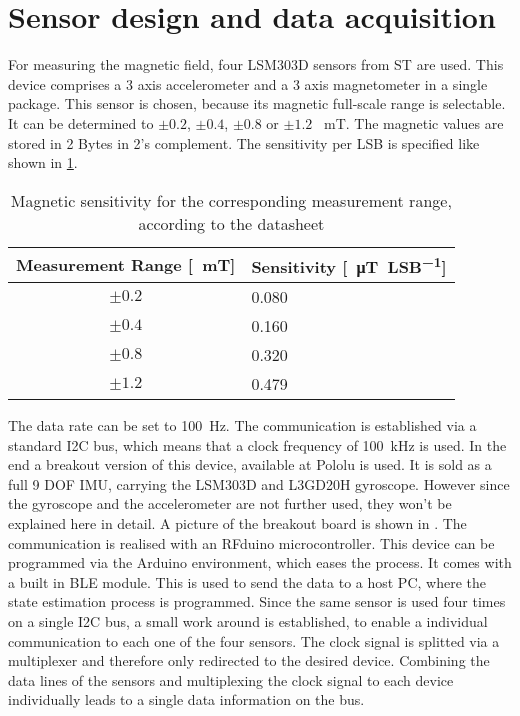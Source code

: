 \section{Sensor design and data acquisition} \label{cha:sensors}

For measuring the magnetic field, four LSM303D sensors  from ST are used. This device comprises a 3 axis accelerometer and a 3 axis magnetometer in a single package. This sensor is chosen, because its magnetic full-scale range is selectable. It can be determined to $ \pm 0.2$, $ \pm 0.4 $, $ \pm 0.8 $ or $ \pm 1.2 $ \SI{}{\milli\tesla}. The magnetic values are stored in 2 Bytes in 2's complement. The sensitivity per \ac{LSB} is specified like shown in \ref{tab:magSensitivity}.

\begin{table}[h]
\centering
\begin{tabular}{|c|l|}
\hline
\textbf{Measurement Range [\SI{}{\milli\tesla}]} & \textbf{Sensitivity [\SI{}{\micro\tesla \per LSB}]} \\ \hline
$ \pm 0.2 $ & 0.080 \\ \hline
$ \pm 0.4 $ & 0.160 \\ \hline
$ \pm 0.8 $ & 0.320 \\ \hline
$ \pm 1.2 $ & 0.479 \\ \hline
\end{tabular}
\caption{Magnetic sensitivity for the corresponding measurement range, according to the datasheet}
\label{tab:magSensitivity}
\end{table}

The data rate can be set to \SI{100}{\Hz}. The communication is established via a standard I2C bus, which means that a clock frequency of \SI{100}{\kilo \Hz} is used. In the end a breakout version of this device, available at Pololu  is used. It is sold as a full 9 \ac{DOF} IMU, carrying the LSM303D and L3GD20H gyroscope. However since the gyroscope and the accelerometer are not further used, they won't be explained here in detail. A picture of the breakout board is shown in . The communication is realised with an RFduino microcontroller. This device can be programmed via the Arduino environment, which eases the process. It comes with a built in \ac{BLE} module. This is used to send the data to a host PC, where the state estimation process is programmed. Since the same sensor is used four times on a single I2C bus, a small work around is established, to enable a individual communication to each one of the four sensors. The clock signal is splitted via a multiplexer and therefore only redirected to the desired device. Combining the data lines of the sensors and multiplexing the clock signal to each device individually leads to a single data information on the bus.



